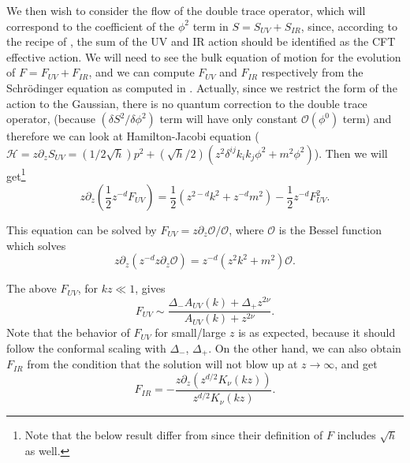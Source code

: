 \documentclass[12pt,epsbox]{article}
\numberwithin{equation}{section}
\begin{document}
We then wish to consider the flow of the double trace operator, which will correspond to the coefficient of the $\phi^2$ term in $S=S_{UV}+S_{IR}$, since, according to the recipe of \cite{dVV}, the sum of the UV and IR action should be identified as the CFT effective action. We will need to see the bulk equation of motion for the evolution of $F=F_{UV}+F_{IR}$, and we can compute $F_{UV}$ and $F_{IR}$ respectively from the Schr\"odinger equation as computed in \cite{Polchinski}. Actually, since we restrict the form of the action to the Gaussian, there is no quantum correction to the double trace operator, (because $(\delta S^2 / \delta \phi^2)$ term will have only constant $\mathcal{O}(\phi^0)$ term) and therefore we can look at Hamilton-Jacobi equation
($\mathcal{H}= z\partial_z S_{UV}=(1/2 \sqrt{h})p^2+(\sqrt{h}/2)( z^2 \delta^{ij} k_i k_j \phi^2 + m^2 \phi^2)$).
 Then we will get\footnote{Note that the below result differ from \cite{Polchinski} since their definition of $F$ includes $\sqrt{h}$ as well.}
\begin{equation}
z \partial_z (\frac{1}{2} z^{-d} F_{UV})=\frac{1}{2}(z^{2-d}k^2 + z^{-d}m^2) - \frac{1}{2} z^{-d}F_{UV}^2.
\end{equation}

This equation can be solved by $F_{UV}= z \partial_z \mathcal{O} / \mathcal{O}$, where $\mathcal{O}$ is the Bessel function which solves
\begin{equation}
z \partial_z (z^{-d} z \partial_z \mathcal{O}) = z^{-d} (z^2 k^2 + m^2) \mathcal{O}.
\end{equation}

The above $F_{UV}$, for $kz  \ll  1$, gives
\begin{equation}
F_{UV} \sim \frac{\Delta_- A_{UV}(k)+ \Delta_+ z^{2\nu}}{A_{UV}(k)+ z^{2\nu}}.
\end{equation}
Note that the behavior of $F_{UV}$ for small/large $z$ is as expected, because it should follow the conformal scaling with $\Delta_-$, $\Delta_+$.
On the other hand, we can also obtain $F_{IR}$ from the condition that the solution will not blow up at $z \rightarrow \infty$, and get
\begin{equation}
F_{IR}=- \frac{z \partial_z (z^{d/2}K_{\nu}(kz))}{z^{d/2}K_{\nu}(kz)}.
\end{equation}
\end{document}
